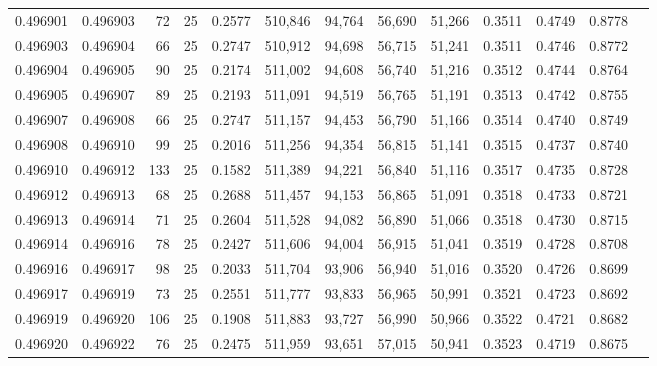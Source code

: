 \begin{tabular}{rrrrrrrrrrrrr}
0.496901 & 0.496903 &    72 &  25 &                                     0.2577 & 510,846 &  94,764 &  56,690 &  51,266 & 0.3511 & 0.4749 & 0.8778 \\
0.496903 & 0.496904 &    66 &  25 &                                     0.2747 & 510,912 &  94,698 &  56,715 &  51,241 & 0.3511 & 0.4746 & 0.8772 \\
0.496904 & 0.496905 &    90 &  25 &                                     0.2174 & 511,002 &  94,608 &  56,740 &  51,216 & 0.3512 & 0.4744 & 0.8764 \\
0.496905 & 0.496907 &    89 &  25 &                                     0.2193 & 511,091 &  94,519 &  56,765 &  51,191 & 0.3513 & 0.4742 & 0.8755 \\
0.496907 & 0.496908 &    66 &  25 &                                     0.2747 & 511,157 &  94,453 &  56,790 &  51,166 & 0.3514 & 0.4740 & 0.8749 \\
0.496908 & 0.496910 &    99 &  25 &                                     0.2016 & 511,256 &  94,354 &  56,815 &  51,141 & 0.3515 & 0.4737 & 0.8740 \\
0.496910 & 0.496912 &   133 &  25 &                                     0.1582 & 511,389 &  94,221 &  56,840 &  51,116 & 0.3517 & 0.4735 & 0.8728 \\
0.496912 & 0.496913 &    68 &  25 &                                     0.2688 & 511,457 &  94,153 &  56,865 &  51,091 & 0.3518 & 0.4733 & 0.8721 \\
0.496913 & 0.496914 &    71 &  25 &                                     0.2604 & 511,528 &  94,082 &  56,890 &  51,066 & 0.3518 & 0.4730 & 0.8715 \\
0.496914 & 0.496916 &    78 &  25 &                                     0.2427 & 511,606 &  94,004 &  56,915 &  51,041 & 0.3519 & 0.4728 & 0.8708 \\
0.496916 & 0.496917 &    98 &  25 &                                     0.2033 & 511,704 &  93,906 &  56,940 &  51,016 & 0.3520 & 0.4726 & 0.8699 \\
0.496917 & 0.496919 &    73 &  25 &                                     0.2551 & 511,777 &  93,833 &  56,965 &  50,991 & 0.3521 & 0.4723 & 0.8692 \\
0.496919 & 0.496920 &   106 &  25 &                                     0.1908 & 511,883 &  93,727 &  56,990 &  50,966 & 0.3522 & 0.4721 & 0.8682 \\
0.496920 & 0.496922 &    76 &  25 &                                     0.2475 & 511,959 &  93,651 &  57,015 &  50,941 & 0.3523 & 0.4719 & 0.8675 \\

\end{tabular}
